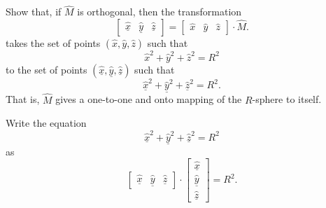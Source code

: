 \documentclass{ximera}
\begin{document}
\begin{problem}
  Show that, if $\hat{M}$ is orthogonal, then the transformation
  \[
  \begin{bmatrix}
    \underline{\hat{x}} & \underline{\hat{y}} & \underline{\hat{z}}
  \end{bmatrix}
  =
  \begin{bmatrix}
    \hat{x} & \hat{y} & \hat{z}
  \end{bmatrix}
  \cdot \hat{M}.
  \]
  takes the set of points $\left(\hat{x},\hat{y},\hat{z}\right)$ such
  that
\[
\hat{x}^2 + \hat{y}^2 + \hat{z}^2 = R^2
\]
to the set of points
$\left(\underline{\hat{x}},\underline{\hat{y}},\underline{\hat{z}}\right)$
such that
\[
\underline{\hat{x}}^2 + \underline{\hat{y}}^{2} + \underline{\hat{z}}^{2}=R^2.
\]
That is, $\hat{M}$ gives a one-to-one and onto mapping of the $R$-sphere to
itself.
\begin{hint}
  Write the equation
  \[
  \underline{\hat{x}}^2 + \underline{\hat{y}}^{2} + \underline{\hat{z}}^{2}=R^2
  \]
  as
  \[
  \begin{bmatrix}
    \underline{\hat{x}} & \underline{\hat{y}} & \underline{\hat{z}}%
  \end{bmatrix}  
  \cdot
  \begin{bmatrix}
    \underline{\hat{x}}\\
    \underline{\hat{y}}\\
    \underline{\hat{z}}
  \end{bmatrix}  =R^2.
  \]
\end{hint}
\end{problem}
\end{document}
